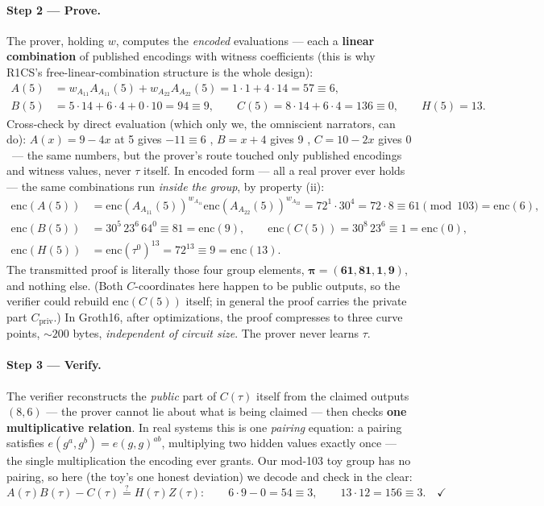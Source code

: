 \documentclass[10pt]{article}
\begin{document}
\paragraph{Step 2 --- Prove.} The prover, holding $w$, computes the
\emph{encoded} evaluations --- each a \textbf{linear combination} of
published encodings with witness coefficients (this is why R1CS's
free-linear-combination structure is the whole design):
\[
\begin{aligned}
A(5) &= w_{A_{11}} A_{A_{11}}(5) + w_{A_{22}} A_{A_{22}}(5)
      = 1\cdot1 + 4\cdot14 = 57 \equiv 6,\\
B(5) &= 5\cdot14 + 6\cdot4 + 0\cdot10 = 94 \equiv 9, \qquad
C(5) = 8\cdot14 + 6\cdot4 = 136 \equiv 0, \qquad H(5) = 13.
\end{aligned}
\]
Cross-check by direct evaluation (which only we, the omniscient
narrators, can do): $A(x) = 9-4x$ at 5 gives $-11 \equiv 6$
\checkmark, $B = x+4$ gives 9 \checkmark, $C = 10-2x$ gives 0
\checkmark\ --- the same numbers, but the prover's route touched
only published encodings and witness values, never $\tau$ itself.
In encoded form --- all a real prover ever holds --- the same
combinations run \emph{inside the group}, by property (ii):
\[
\begin{aligned}
\mathrm{enc}(A(5)) &= \mathrm{enc}(A_{A_{11}}(5))^{w_{A_{11}}}
 \mathrm{enc}(A_{A_{22}}(5))^{w_{A_{22}}} = 72^{1}\cdot 30^{4}
 = 72\cdot 8 \equiv 61 \pmod{103} = \mathrm{enc}(6),\\
\mathrm{enc}(B(5)) &= 30^{5}\, 23^{6}\, 64^{0} \equiv 81
 = \mathrm{enc}(9), \qquad
\mathrm{enc}(C(5)) = 30^{8}\, 23^{6} \equiv 1 = \mathrm{enc}(0),\\
\mathrm{enc}(H(5)) &= \mathrm{enc}(\tau^{0})^{13} = 72^{13}
 \equiv 9 = \mathrm{enc}(13).
\end{aligned}
\]
The transmitted proof is literally those four group elements,
$\boldsymbol{\pi = (61, 81, 1, 9)}$, and nothing else. (Both
$C$-coordinates here happen to be public outputs, so the verifier
could rebuild $\mathrm{enc}(C(5))$ itself; in general the proof
carries the private part $C_{\text{priv}}$.) In Groth16, after
optimizations, the proof compresses to three curve points,
${\sim}200$ bytes, \emph{independent of circuit size}. The prover
never learns $\tau$.

\paragraph{Step 3 --- Verify.} The verifier reconstructs the
\emph{public} part of $C(\tau)$ itself from the claimed outputs
$(8, 6)$ --- the prover cannot lie about what is being claimed ---
then checks \textbf{one multiplicative relation}. In real systems
this is one \emph{pairing} equation: a pairing satisfies
$e(g^a, g^b) = e(g,g)^{ab}$, multiplying two hidden values exactly
once --- the single multiplication the encoding ever grants. Our
mod-103 toy group has no pairing, so here (the toy's one honest
deviation) we decode and check in the clear:
\[
A(\tau)B(\tau) - C(\tau) \stackrel{?}{=} H(\tau)Z(\tau):
\qquad 6\cdot9 - 0 = 54 \equiv 3, \qquad 13\cdot12 = 156 \equiv 3.
\quad\checkmark
\]
\end{document}
